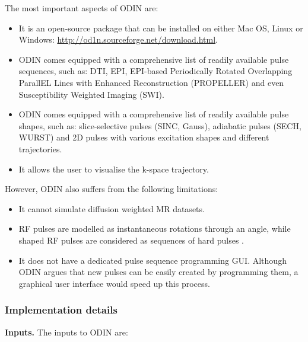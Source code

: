 The most important aspects of ODIN are:
\begin{itemize}

    \item It is an open-source package that can be installed on either Mac OS, Linux or Windows: \url{http://od1n.sourceforge.net/download.html}.
    
    \item ODIN comes equipped with a comprehensive list of readily available pulse sequences, such as: DTI, EPI, EPI-based Periodically Rotated Overlapping ParallEL Lines with Enhanced Reconstruction (PROPELLER) and even Susceptibility Weighted Imaging (SWI).
    
    \item ODIN comes equipped with a comprehensive list of readily available pulse shapes, such as: slice-selective pulses (SINC, Gauss), adiabatic pulses (SECH, WURST) and 2D pulses with various excitation shapes and different trajectories.
    
    \item It allows the user to visualise the k-space trajectory.
    
\end{itemize}

\hfill

However, ODIN also suffers from the following limitations:
\begin{itemize}
    
    \item It cannot simulate diffusion weighted MR datasets.
    
    \item RF pulses are modelled as instantaneous rotations through an angle, while shaped RF pulses are considered as sequences of hard pulses \cite{bernsteinhandbook}.
    
    \item It does not have a dedicated pulse sequence programming GUI. Although ODIN argues that new pulses can be easily created by programming them, a graphical user interface would speed up this process.
    
\end{itemize}

\hfill

\subsubsection{Implementation details}

\textbf{Inputs.} The inputs to ODIN are:

